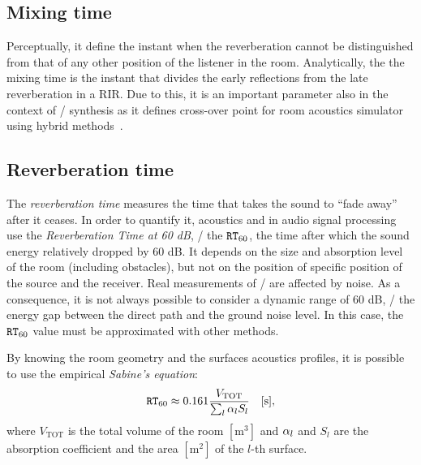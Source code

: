 \subsection{Mixing time}
Perceptually, it define the instant when the reverberation cannot be distinguished from that of any other position of the listener in the room.
Analytically,  the the mixing time is the instant that divides the early reflections from the late reverberation in a RIR.
Due to this, it is an important parameter also in the context of \RIRs/ synthesis as it defines cross-over point for room acoustics simulator using hybrid methods~.

\subsection{Reverberation time}
The \textit{reverberation time} measures the time that takes the sound to ``fade away'' after it ceases.
In order to quantify it, acoustics and in audio signal processing use the \textit{Reverberation Time at 60 dB}, \ie/
the $\mathtt{RT}_{60}$, the time after which the sound energy relatively dropped by 60 dB.
It depends on the size and absorption level of the room (including obstacles), but not on the position of specific position of the source and the receiver.
Real measurements of \RIRs/ are affected by noise.
As a consequence, it is not always possible to consider a dynamic range of 60 dB,
\ie/ the energy gap between the direct path and the ground noise level.
In this case, the $\mathtt{RT}_{60}$ value must be approximated with other methods.

By knowing the room geometry and the surfaces acoustics profiles,
it is possible to use the empirical \textit{Sabine's equation}:
\begin{equation}
    \mathtt{RT}_{60}
    \approx 0.161 \frac{V_{\text{TOT}}}{\sum_l \alpha_l S_l} \hspace{1em} [\si{\second}]
    ,
\end{equation}
where $V_{\text{TOT}}$ is the total volume of the room $[\si{\metre^3}]$ and $\alpha_l$ and $S_l$ are the
absorption coefficient and the area $[\si{\metre^2}]$  of the $l$-th surface.

